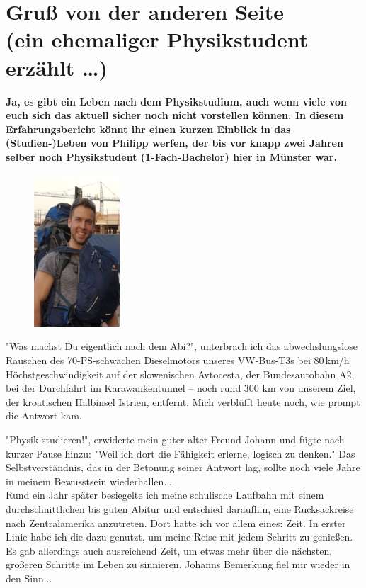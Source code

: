 \section[Gruß von der anderen Seite (ein ehemaliger Physikstudent erzählt \dots)]{Gruß von der anderen Seite\\(ein ehemaliger Physikstudent erzählt \dots)}
\textbf{
Ja, es gibt ein Leben nach dem Physikstudium, auch wenn viele von euch sich das aktuell sicher noch nicht vorstellen können.
In diesem Erfahrungsbericht könnt ihr einen kurzen Einblick in das (Studien-)Leben von Philipp werfen, der bis vor knapp zwei Jahren selber noch Physikstudent (1-Fach-Bachelor) hier in Münster war.
}


\begin{multicols*}{2}

\begin{figure}
	\includegraphics[width=3.2cm]{res/philipp_van_wickevoort_crommelin.PNG}
\end{figure}

"Was machst Du eigentlich nach dem Abi?", unterbrach ich das abwechslungslose Rauschen des 70-PS-schwachen Dieselmotors unseres
VW-Bus-T3s bei 80\,km/h Höchstgeschwindigkeit auf der slowenischen Avtocesta, der Bundesautobahn A2, bei der Durchfahrt im
Karawankentunnel – noch rund 300 km von unserem Ziel, der kroatischen Halbinsel Istrien, entfernt.
Mich verblüfft heute noch, wie prompt die Antwort kam.

"Physik studieren!", erwiderte mein guter alter Freund Johann und fügte nach kurzer Pause hinzu:
"Weil ich dort die Fähigkeit erlerne, logisch zu denken."
Das Selbstverständnis, das in der Betonung seiner Antwort lag, sollte noch viele Jahre in meinem Bewusstsein wiederhallen... \\ 

Rund ein Jahr später besiegelte ich meine schulische Laufbahn mit einem durchschnittlichen bis guten Abitur und entschied daraufhin,
eine Rucksackreise nach Zentralamerika anzutreten.
Dort hatte ich vor allem eines: Zeit. In erster Linie habe ich die dazu genutzt, um meine Reise mit jedem Schritt zu genießen.
Es gab allerdings auch ausreichend Zeit, um etwas mehr über die nächsten, größeren Schritte im Leben zu sinnieren. Johanns Bemerkung fiel mir wieder in den Sinn... \\ 


\end{multicols*}
